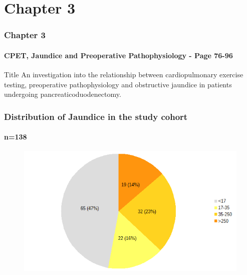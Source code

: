 \documentclass[10pt]{beamer}
\begin{document}
\section{Chapter 3}

\begin{frame}
	\frametitle{Chapter 3}
	\framesubtitle{CPET, Jaundice and Preoperative Pathophysiology - Page 76-96 }
	\begin{block}{Title}
	An investigation into the relationship between cardiopulmonary exercise testing, preoperative pathophysiology and obstructive jaundice in patients undergoing pancreaticoduodenectomy.
	\end{block}
\end{frame}

\begin{frame}
	\frametitle{Distribution of Jaundice in the study cohort }
	\framesubtitle{n=138}

	\begin{figure}
		\centering
		\includegraphics[width=0.7\linewidth]{jaundice_distribution}
		\caption{}
		\label{fig:jaundice_distribution}
	\end{figure}
\end{frame}
\end{document}
